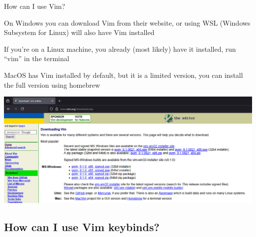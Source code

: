 \documentclass[12pt]{beamer}
\begin{document}
\begin{frame}{How can I use Vim?}
    
    \begin{enumerate}
        {\scriptsize \item On Windows you can download Vim from their website, or using WSL (Windows Subsystem for Linux) will also have Vim installed}
{\scriptsize \item If you’re on a Linux machine, you already (most likely) have it installed, run “vim” in the terminal}
{\scriptsize \item MacOS has Vim installed by default, but it is a limited version, you can install the full version using homebrew}
    \end{enumerate}
\includegraphics[width=\linewidth]{images/Vim-Download.PNG}
    
\end{frame}

\subsection{How can I use Vim keybinds?}
\end{document}
